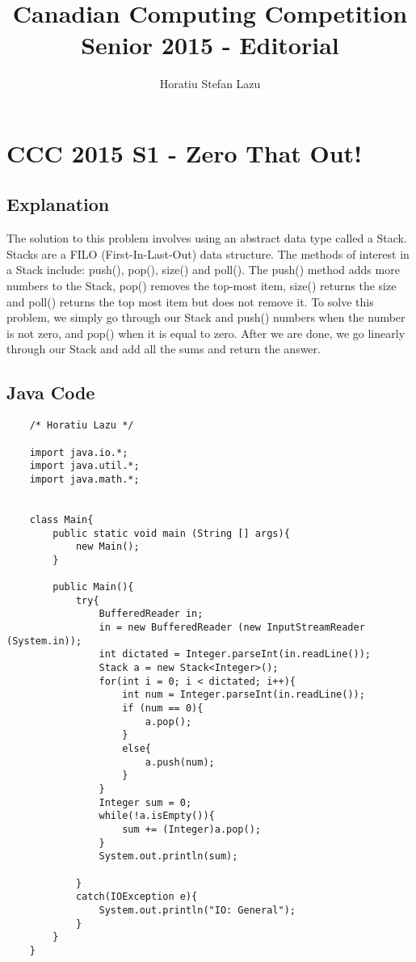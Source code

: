 \documentclass[52pt]{article}
\title{Canadian Computing Competition Senior 2015 - Editorial}
\author{Horatiu Stefan Lazu}
\begin{document}
	\maketitle
	\newpage
	
	
	\section {CCC 2015 S1 - Zero That Out!}
	\subsection {Explanation}
	
	The solution to this problem involves using an abstract data type called a Stack. Stacks are a FILO (First-In-Last-Out) data structure. The methods of interest in a Stack include: push(), pop(), size() and poll(). The push() method adds more numbers to the Stack, pop() removes the top-most item, size() returns the size and poll() returns the top most item but does not remove it. To solve this problem, we simply go through our Stack and push() numbers when the number is not zero, and pop() when it is equal to zero. After we are done, we go linearly through our Stack and add all the sums and return the answer.
	\subsection {Java Code}
	\begin{lstlisting}
	/* Horatiu Lazu */

	import java.io.*;
	import java.util.*;
	import java.math.*;


	class Main{
		public static void main (String [] args){
			new Main();
		}

		public Main(){
			try{
				BufferedReader in;
				in = new BufferedReader (new InputStreamReader (System.in));
				int dictated = Integer.parseInt(in.readLine());
				Stack a = new Stack<Integer>();
				for(int i = 0; i < dictated; i++){
					int num = Integer.parseInt(in.readLine());
					if (num == 0){
						a.pop();	
					}
					else{
						a.push(num);	
					}
				}
				Integer sum = 0;
				while(!a.isEmpty()){
					sum += (Integer)a.pop();
				}
				System.out.println(sum);
				
			}
			catch(IOException e){
				System.out.println("IO: General");
			}
		}
	}
	\end{lstlisting}
	\newpage
	
\end{document}
